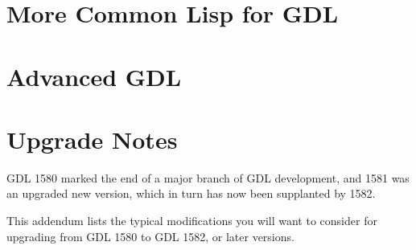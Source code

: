\documentclass [11pt]{book}
\begin{document}
\chapter{More Common Lisp for GDL}

\label{chap:morecommonlispforgdl}



\chapter{Advanced GDL}

\label{chap:advancedgdl}



\chapter*{Upgrade Notes}

\label{chap:upgradenotes}

GDL 1580 marked the end of a major branch of GDL development,
and 1581 was an upgraded new version, which in turn has now been
supplanted by 1582.

This addendum lists the typical modifications you will want to
consider for upgrading from GDL 1580 to GDL 1582, or later versions.
\end{document}
